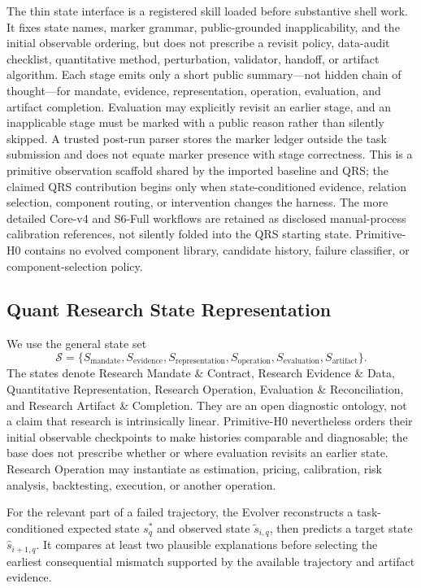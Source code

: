 The thin state interface is a registered skill loaded before substantive shell
work. It fixes state names, marker grammar, public-grounded inapplicability, and
the initial observable ordering, but does not prescribe a revisit policy,
data-audit checklist, quantitative method, perturbation, validator, handoff, or
artifact algorithm.
Each stage emits only a short public summary---not hidden chain of
thought---for mandate, evidence, representation, operation, evaluation, and
artifact completion. Evaluation may explicitly revisit an earlier stage, and
an inapplicable stage must be marked with a public reason rather than silently
skipped. A trusted post-run parser stores the marker ledger outside the task
submission and does not equate marker presence with stage correctness.
This is a primitive observation scaffold shared by the imported baseline and QRS;
the claimed QRS contribution begins only when state-conditioned evidence,
relation selection, component routing, or intervention changes the harness.
The more detailed Core-v4 and S6-Full workflows are retained as disclosed
manual-process calibration references, not silently folded into the QRS
starting state. Primitive-H0 contains no evolved component library, candidate
history, failure classifier, or component-selection policy.

\subsection{Quant Research State Representation}

We use the general state set
\begin{equation}
    \mathcal{S}=\{S_{\mathrm{mandate}},S_{\mathrm{evidence}},
    S_{\mathrm{representation}},S_{\mathrm{operation}},
    S_{\mathrm{evaluation}},S_{\mathrm{artifact}}\}.
\end{equation}
The states denote Research Mandate \& Contract, Research Evidence \& Data,
Quantitative Representation, Research Operation, Evaluation \& Reconciliation,
and Research Artifact \& Completion. They are an open diagnostic ontology, not
a claim that research is intrinsically linear. Primitive-H0 nevertheless orders
their initial observable checkpoints to make histories comparable and
diagnosable; the base does not prescribe whether or where evaluation revisits
an earlier state.
Research Operation may instantiate as estimation, pricing, calibration, risk
analysis, backtesting, execution, or another operation.

For the relevant part of a failed trajectory, the Evolver reconstructs a
task-conditioned expected state $s^*_q$ and observed state
$\tilde{s}_{i,q}$, then predicts a target state $\hat{s}_{i+1,q}$. It compares
at least two plausible explanations before selecting the earliest consequential
mismatch supported by the available trajectory and artifact evidence.

